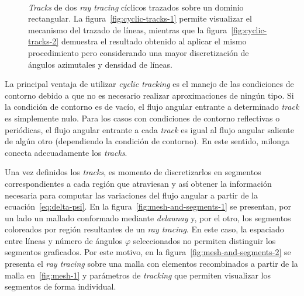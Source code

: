 \documentclass[11pt]{article}
\numberwithin{equation}{section}
\begin{document}
\begin{figure}[!h]
 \begin{center}
  \\
  \caption{\emph{Tracks} de dos \emph{ray tracing} cíclicos trazados sobre un dominio rectangular. La figura~\ref{fig:cyclic-tracks-1} permite visualizar el mecanismo del trazado de líneas, mientras que la figura~\ref{fig:cyclic-tracks-2} demuestra el resultado obtenido al aplicar el mismo procedimiento pero considerando una mayor discretización de ángulos azimutales y densidad de líneas.}
  \label{fig:cyclic-tracks}
 \end{center}
\end{figure}

La principal ventaja de utilizar \emph{cyclic tracking} es el manejo de las condiciones de contorno debido a que no es necesario realizar aproximaciones de ningún tipo. Si la condición de contorno es de vacío, el flujo angular entrante a determinado \emph{track} es simplemente nulo. Para los casos con condiciones de contorno reflectivas o periódicas, el flujo angular entrante a cada \emph{track} es igual al flujo angular saliente de algún otro (dependiendo la condición de contorno). En este sentido, milonga conecta adecuadamente los \emph{tracks}.

Una vez definidos los \emph{tracks}, es momento de discretizarlos en segmentos correspondientes a cada región que atraviesan y así obtener la información necesaria para computar las variaciones del flujo angular a partir de la ecuación~\eqref{eq:delta-psi}. En la figura~\ref{fig:mesh-and-segments-1} se presentan, por un lado un mallado conformado mediante \emph{delaunay} y, por el otro, los segmentos coloreados por región resultantes de un \emph{ray tracing}. En este caso, la espaciado entre líneas y número de ángulos $\varphi$ seleccionados no permiten distinguir los segmentos graficados. Por este motivo, en la figura~\ref{fig:mesh-and-segments-2} se presenta el \emph{ray tracing} sobre una malla con elementos recombinados a partir de la malla en~\ref{fig:mesh-1} y parámetros de \emph{tracking} que permiten visualizar los segmentos de forma individual.
\end{document}
